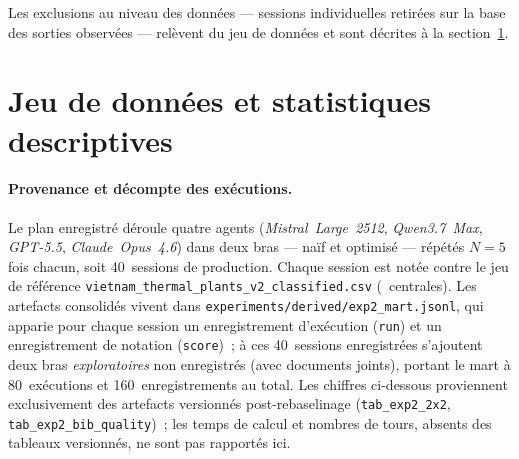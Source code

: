 \documentclass[a4paper,11pt]{report}
\begin{document}
Les exclusions au niveau des données --- sessions individuelles retirées sur la base des sorties observées --- relèvent du jeu de données et sont décrites à la section~\ref{sec:exp2-sota:donnees}.

\section{Jeu de données et statistiques descriptives}\label{sec:exp2-sota:donnees}

\paragraph{Provenance et décompte des exécutions.} Le plan enregistré déroule quatre agents (\emph{Mistral~Large~2512}, \emph{Qwen3.7~Max}, \emph{GPT-5.5}, \emph{Claude~Opus~4.6}) dans deux bras --- naïf et optimisé --- répétés $N{=}5$ fois chacun, soit 40~sessions de production. Chaque session est notée contre le jeu de référence \texttt{vietnam\_thermal\_plants\_v2\_classified.csv} (\NumRefPlants~centrales). Les artefacts consolidés vivent dans \texttt{experiments/derived/exp2\_mart.jsonl}, qui apparie pour chaque session un enregistrement d'exécution (\texttt{run}) et un enregistrement de notation (\texttt{score})~; à ces 40~sessions enregistrées s'ajoutent deux bras \emph{exploratoires} non enregistrés (avec documents joints), portant le mart à 80~exécutions et 160~enregistrements au total. Les chiffres ci-dessous proviennent exclusivement des artefacts versionnés post-rebaselinage (\texttt{tab\_exp2\_2x2}, \texttt{tab\_exp2\_bib\_quality})~; les temps de calcul et nombres de tours, absents des tableaux versionnés, ne sont pas rapportés ici.
\end{document}
